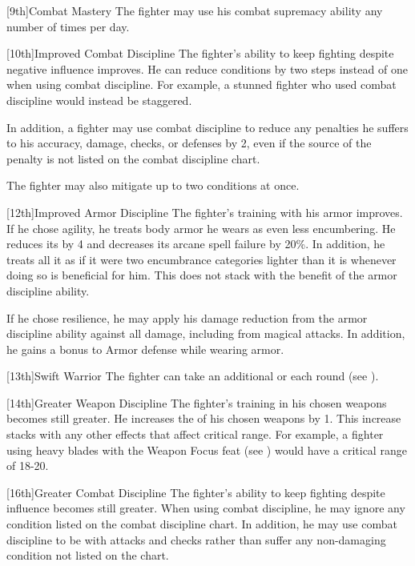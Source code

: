         [9th]{Combat Mastery}
        The fighter may use his combat supremacy ability any number of times per day.

        [10th]{Improved Combat Discipline}
        The fighter's ability to keep fighting despite negative influence improves.
        He can reduce conditions by two steps instead of one when using combat discipline.
        For example, a stunned fighter who used combat discipline would instead be staggered.
        \par In addition, a fighter may use combat discipline to reduce any penalties he suffers to his accuracy, damage, checks, or defenses by 2, even if the source of the penalty is not listed on the combat discipline chart.
        \par The fighter may also mitigate up to two conditions at once.

        [12th]{Improved Armor Discipline}
        The fighter's training with his armor improves.
        If he chose agility, he treats body armor he wears as even less encumbering.
        He reduces its  by 4 and decreases its arcane spell failure by 20\%.
        In addition, he treats all it as if it were two encumbrance categories lighter than it is whenever doing so is beneficial for him.
        This does not stack with the benefit of the armor discipline ability.

        If he chose resilience, he may apply his damage reduction from the armor discipline ability against all damage, including from magical attacks.
        In addition, he gains a  bonus to Armor defense while wearing armor.

        [13th]{Swift Warrior}
        The fighter can take an additional  or  each round (see ).

        [14th]{Greater Weapon Discipline}
        The fighter's training in his chosen weapons becomes still greater.
        He increases the  of his chosen weapons by 1.
        This increase stacks with any other effects that affect critical range.
        For example, a fighter using heavy blades with the Weapon Focus feat (see ) would have a critical range of 18-20.

        [16th]{Greater Combat Discipline}
        The fighter's ability to keep fighting despite influence becomes still greater.
        When using combat discipline, he may ignore any condition listed on the combat discipline chart.
        In addition, he may use combat discipline to be \severelyimpaired with attacks and checks rather than suffer any non-damaging condition not listed on the chart.


